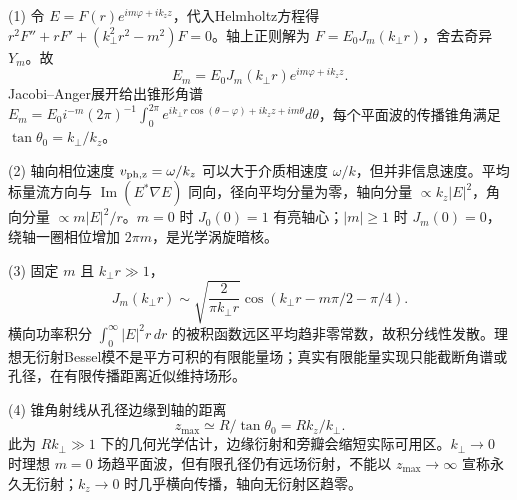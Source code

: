 (1) 令 \(E=F(r)e^{im\varphi+ik_zz}\)，代入Helmholtz方程得
\(r^2F''+rF'+(k_\perp^2r^2-m^2)F=0\)。轴上正则解为 \(F=E_0J_m(k_\perp r)\)，舍去奇异 \(Y_m\)。故
\[
\boxed{E_m=E_0J_m(k_\perp r)e^{im\varphi+ik_zz}}.
\]
Jacobi–Anger展开给出锥形角谱
\(E_m=E_0i^{-m}(2\pi)^{-1}\int_0^{2\pi}e^{ik_\perp r\cos(\theta-\varphi)+ik_zz+im\theta}d\theta\)，每个平面波的传播锥角满足 \(\tan\theta_0=k_\perp/k_z\)。

(2) 轴向相位速度 \(v_{\rm ph,z}=\omega/k_z\) 可以大于介质相速度 \(\omega/k\)，但并非信息速度。平均标量流方向与 \(\operatorname{Im}(E^*\nabla E)\) 同向，径向平均分量为零，轴向分量 \(\propto k_z|E|^2\)，角向分量 \(\propto m|E|^2/r\)。\(m=0\) 时 \(J_0(0)=1\) 有亮轴心；\(|m|\ge1\) 时 \(J_m(0)=0\)，绕轴一圈相位增加 \(2\pi m\)，是光学涡旋暗核。

(3) 固定 \(m\) 且 \(k_\perp r\gg1\)，
\[
J_m(k_\perp r)\sim\sqrt{\frac2{\pi k_\perp r}}
\cos(k_\perp r-m\pi/2-\pi/4).
\]
横向功率积分 \(\int_0^\infty|E|^2r\,dr\) 的被积函数远区平均趋非零常数，故积分线性发散。理想无衍射Bessel模不是平方可积的有限能量场；真实有限能量实现只能截断角谱或孔径，在有限传播距离近似维持场形。

(4) 锥角射线从孔径边缘到轴的距离
\[
\boxed{z_{\max}\simeq R/\tan\theta_0=Rk_z/k_\perp}.
\]
此为 \(Rk_\perp\gg1\) 下的几何光学估计，边缘衍射和旁瓣会缩短实际可用区。\(k_\perp\to0\) 时理想 \(m=0\) 场趋平面波，但有限孔径仍有远场衍射，不能以 \(z_{\max}\to\infty\) 宣称永久无衍射；\(k_z\to0\) 时几乎横向传播，轴向无衍射区趋零。
